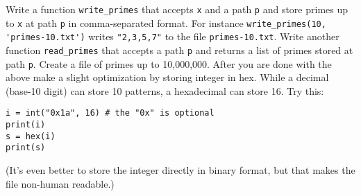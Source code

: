   Write a function \verb!write_primes! that accepts \verb!x! and a path \verb!p!
  and store primes up to \verb!x! at path \verb!p! in comma-separated format.
  For instance \verb!write_primes(10, 'primes-10.txt')!
  writes \verb!"2,3,5,7"! to the file \verb!primes-10.txt!.
  Write another function \verb!read_primes! that accepts a path \verb!p!
  and returns a list of primes stored at path \verb!p!.
  Create a file of primes up to 10,000,000.
  After you are done with the above make a slight optimization by storing
  integer in hex.
  While a decimal (base-10 digit) can store 10 patterns,
  a hexadecimal can store 16.
  Try this:
  \begin{Verbatim}[frame=single,fontsize=\footnotesize]
i = int("0x1a", 16) # the "0x" is optional
print(i)
s = hex(i)
print(s)
  \end{Verbatim}
  (It's even better to store the integer directly in binary format, but
  that makes the file non-human readable.)
